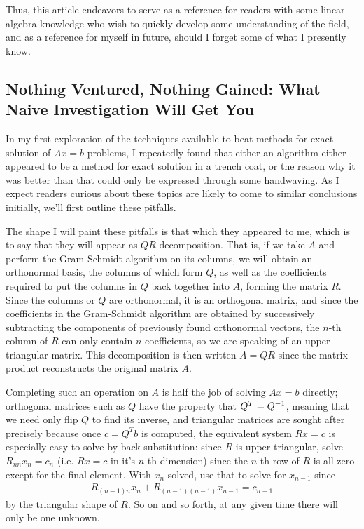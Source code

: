 \documentclass[11pt]{article}
\begin{document}
Thus, this article endeavors to serve as a reference for readers with some linear algebra knowledge who wish to quickly develop some understanding of the field, and as a reference for myself in future, should I forget some of what I presently know.

\subsection{Nothing Ventured, Nothing Gained: What Naive Investigation Will Get You}

In my first exploration of the techniques available to beat methods for exact solution of $Ax=b$ problems, I repeatedly found that either an algorithm either appeared to be a method for exact solution in a trench coat, or the reason why it was better than that could only be expressed through some handwaving. As I expect readers curious about these topics are likely to come to similar conclusions initially, we'll first outline these pitfalls.

The shape I will paint these pitfalls is that which they appeared to me, which is to say that they will appear as $QR$-decomposition. That is, if we take $A$ and perform the Gram-Schmidt algorithm on its columns, we will obtain an orthonormal basis, the columns of which form $Q$, as well as the coefficients required to put the columns in $Q$ back together into $A$, forming the matrix $R$. Since the columns or $Q$ are orthonormal, it is an orthogonal matrix, and since the coefficients in the Gram-Schmidt algorithm are obtained by successively subtracting the components of previously found orthonormal vectors, the $n$-th column of $R$ can only contain $n$ coefficients, so we are speaking of an upper-triangular matrix. This decomposition is then written $A = QR$ since the matrix product reconstructs the original matrix $A$.

Completing such an operation on $A$ is half the job of solving $Ax=b$ directly; orthogonal matrices such as $Q$ have the property that $Q^T = Q^{-1}$, meaning that we need only flip $Q$ to find its inverse, and triangular matrices are sought after precisely because once $c = Q^T b$ is computed, the equivalent system $Rx = c$ is especially easy to solve by back substitution: since $R$ is upper triangular, solve $R_{nn}x_n = c_n$ (i.e. $Rx = c$ in it's $n$-th dimension) since the $n$-th row of $R$ is all zero except for the final element. With $x_n$ solved, use that to solve for $x_{n-1}$ since \begin{gather*} R_{(n-1) n} x_{n} + R_{(n-1) (n-1)} x_{n-1} = c_{n-1} \end{gather*}
by the triangular shape of $R$. So on and so forth, at any given time there will only be one unknown.
\end{document}
